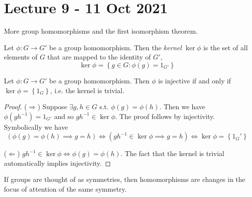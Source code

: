 \section{Lecture 9 - 11 Oct 2021}
More group homomorphisms and the first isomorphism theorem.
\begin{definition} 
  Let $\phi:G\to G'$ be a group homomorphism. Then the \emph{kernel} $\ker\phi$ is the set
  of all elements of $G$ that are mapped to the identity of $G'$, 
  \[\ker \phi = \left\{ g\in G : \phi(g)=1_{G'} \right\}\]
  \label{kernel}
\end{definition}

\begin{theorem}
  Let $\phi:G\to G'$ be a group homomorphism. Then $\phi$ is injective if and only if
  $\ker \phi = \left\{ 1_G \right\}$, i.e. the kernel is trivial.
  \label{kernelHomomorphism}
\end{theorem}
\begin{proof}
  ($\Rightarrow$) Suppose $\exists g,h\in G$ s.t. $\phi(g)=\phi(h)$. Then we have
  $\phi(gh^{-1})=1_{G'}$ and so $gh^{-1}\in\ker\phi$. The proof follows by injectivity. 
  Symbolically we have
  \[ (\phi(g)=\phi(h) \implies g=h) \iff (gh^{-1}\in\ker\phi \implies g=h) \iff \ker\phi
  = \left\{ 1_G' \right\}\]

  ($\Leftarrow$) $gh^{-1}\in\ker\phi \iff \phi(g)=\phi(h)$. The fact that the kernel is
  trivial automatically implies injectivity.
\end{proof}

\begin{remark} 
  If groups are thought of as symmetries, then homomorphisms are changes in the focus of
  attention of the same symmetry.
\end{remark}

